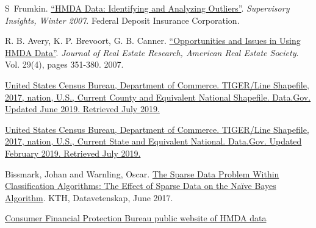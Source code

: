 \documentclass[conference,compsoc]{IEEEtran}
\begin{document}
\begin{thebibliography}{1}

S~Frumkin. \href{https://www.fdic.gov/regulations/examinations/supervisory/insights/siwin07/siwinter07-article4.pdf}{``HMDA Data: Identifying and Analyzing Outliers''}. \textit{Supervisory Insights, Winter 2007}.  Federal Deposit Insurance Corporation. 


R. B. Avery, K. P. Brevoort, G. B. Canner. \href{https://ideas.repec.org/a/jre/issued/v29n42007p351-380.html
}{``Opportunities and Issues in Using HMDA Data''}. \textit{Journal of Real Estate Research, American Real Estate Society}. Vol. 29(4), pages 351-380. 2007.

\href{ https://catalog.data.gov/dataset/tiger-line-shapefile-2017-nation-u-s-current-county-and-equivalent-national-shapefile}{United States Census Bureau, Department of Commerce. TIGER/Line Shapefile, 2017, nation, U.S., Current County and Equivalent National Shapefile. Data.Gov. Updated June 2019. Retrieved July 2019.}

\href{https://catalog.data.gov/dataset/tiger-line-shapefile-2017-nation-u-s-current-state-and-equivalent-national  }{United States Census Bureau, Department of Commerce. TIGER/Line Shapefile, 2017, nation, U.S., Current State and Equivalent National. Data.Gov. Updated February 2019. Retrieved July 2019. }


Bissmark, Johan and Warnling, Oscar. \href{http://www.diva-portal.se/smash/get/diva2:1111045/FULLTEXT01.pdf}{The Sparse Data Problem Within Classification Algorithms: The Effect of Sparse Data on the Naïve Bayes Algorithm}. KTH, Datavetenskap, June 2017.


\href{https://www.consumerfinance.gov/data-research/hmda/historic-data/}{Consumer Financial Protection Bureau public website of HMDA data}


\end{thebibliography}




\end{document}
